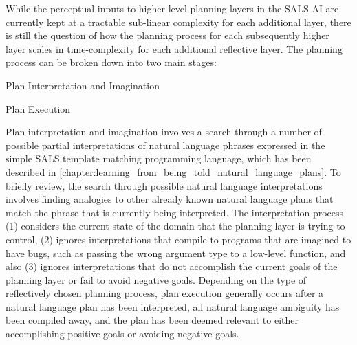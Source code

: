 While the perceptual inputs to higher-level planning layers in the
SALS AI are currently kept at a tractable sub-linear complexity for
each additional layer, there is still the question of how the planning
process for each subsequently higher layer scales in time-complexity
for each additional reflective layer.  The planning process can be
broken down into two main stages:
\begin{packed_enumerate}
\item{Plan Interpretation and Imagination}
\item{Plan Execution}
\end{packed_enumerate}
Plan interpretation and imagination involves a search through a number
of possible partial interpretations of natural language phrases
expressed in the simple SALS template matching programming language,
which has been described in
{\mbox{\autoref{chapter:learning_from_being_told_natural_language_plans}}}.
To briefly review, the search through possible natural language
interpretations involves finding analogies to other already known
natural language plans that match the phrase that is currently being
interpreted.  The interpretation process (1) considers the current
state of the domain that the planning layer is trying to control, (2)
ignores interpretations that compile to programs that are imagined to
have bugs, such as passing the wrong argument type to a low-level
function, and also (3) ignores interpretations that do not accomplish
the current goals of the planning layer or fail to avoid negative
goals.  Depending on the type of reflectively chosen planning process,
plan execution generally occurs after a natural language plan has been
interpreted, all natural language ambiguity has been compiled away,
and the plan has been deemed relevant to either accomplishing positive
goals or avoiding negative goals.

